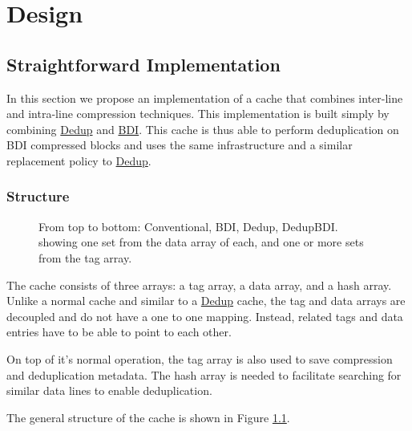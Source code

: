 
\chapter{Design}
\label{ch:Design}

\section{Straightforward Implementation}
\label{sec:Straightforward Implementation}
In this section we propose an implementation of a cache that combines inter-line and intra-line compression techniques. This implementation is built simply by combining \hyperref[sec:Dedup]{Dedup} and \hyperref[sec:BDI]{BDI}. This cache is thus able to perform deduplication on BDI compressed blocks and uses the same infrastructure and a similar replacement policy to \hyperref[sec:Dedup]{Dedup}.

\subsection{Structure}
\label{ssec:DedupBDIStructure}
\begin{figure}
    \caption[DedupBDI Cache]{From top to bottom: Conventional, BDI, Dedup, DedupBDI. showing one set from the data array of each, and one or more sets from the tag array.}
    \label{fig:DedupBDI}
\end{figure}
The cache consists of three arrays: a tag array, a data array, and a hash array. Unlike a normal cache and similar to a \hyperref[sec:Dedup]{Dedup} cache, the tag and data arrays are decoupled and do not have a one to one mapping. Instead, related tags and data entries have to be able to point to each other.\par
On top of it's normal operation, the tag array is also used to save compression and deduplication metadata. The hash array is needed to facilitate searching for similar data lines to enable deduplication.\par
The general structure of the cache is shown in Figure \ref{fig:DedupBDI}.
